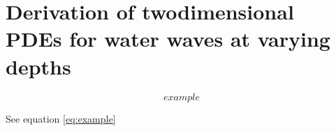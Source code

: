 \chapter{Derivation of twodimensional PDEs for water waves at varying depths}

\begin{equation} \label{eq:example}
example
\end{equation}

See equation \ref{eq:example}